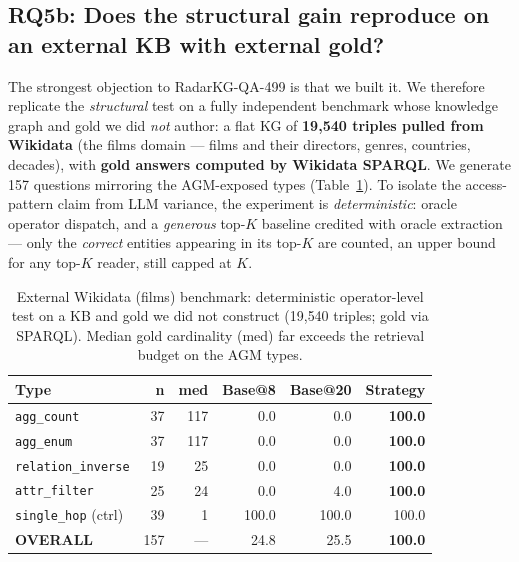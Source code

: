 \documentclass[review]{elsarticle}
\newcommand{\qtype}[1]{\texttt{\small #1}}
\begin{document}
\subsection{RQ5b: Does the structural gain reproduce on an external KB with external gold?}
\label{sec:rq5b}
The strongest objection to RadarKG-QA-499 is that we built it. We therefore replicate the \emph{structural} test on a fully independent benchmark whose knowledge graph and gold we did \emph{not} author: a flat KG of \textbf{19{,}540 triples pulled from Wikidata} (the films domain --- films and their directors, genres, countries, decades), with \textbf{gold answers computed by Wikidata SPARQL}. We generate 157 questions mirroring the AGM-exposed types (Table~\ref{tab:ext}). To isolate the access-pattern claim from LLM variance, the experiment is \emph{deterministic}: oracle operator dispatch, and a \emph{generous} top-$K$ baseline credited with oracle extraction --- only the \emph{correct} entities appearing in its top-$K$ are counted, an upper bound for any top-$K$ reader, still capped at $K$.

\begin{table}[h]
\centering\small
\caption{External Wikidata (films) benchmark: deterministic operator-level test on a KB and gold we did not construct (19{,}540 triples; gold via SPARQL). Median gold cardinality (\textsf{med}) far exceeds the retrieval budget on the AGM types.}
\label{tab:ext}
\begin{tabular}{l r r r r r}
\toprule
\textbf{Type} & \textbf{n} & \textbf{med} & \textbf{Base@8} & \textbf{Base@20} & \textbf{Strategy} \\
\midrule
\qtype{agg\_count}        & 37 & 117 & 0.0 & 0.0 & \textbf{100.0} \\
\qtype{agg\_enum}         & 37 & 117 & 0.0 & 0.0 & \textbf{100.0} \\
\qtype{relation\_inverse} & 19 &  25 & 0.0 & 0.0 & \textbf{100.0} \\
\qtype{attr\_filter}      & 25 &  24 & 0.0 & 4.0 & \textbf{100.0} \\
\qtype{single\_hop} (ctrl)& 39 &   1 & 100.0 & 100.0 & 100.0 \\
\midrule
\textbf{OVERALL}          & 157 & --- & 24.8 & 25.5 & \textbf{100.0} \\
\bottomrule
\end{tabular}
\end{table}
\end{document}
